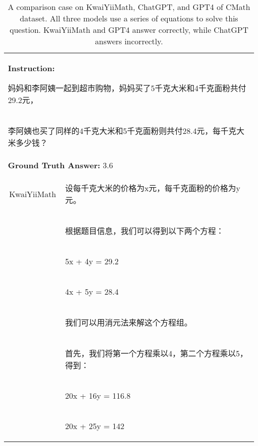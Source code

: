 \documentclass{article}
\begin{document}
\begin{table}[h!]
\caption{A comparison case on KwaiYiiMath, ChatGPT, and GPT4 of CMath dataset. All three models use a series of equations to solve this question. KwaiYiiMath and GPT4 answer correctly, while ChatGPT answers incorrectly.}
\begin{tabular}{ c|l } 
 \hline
 \multicolumn{2}{l}{\textbf{Instruction:} \begin{CJK*}{UTF8}{gbsn} 妈妈和李阿姨一起到超市购物，妈妈买了5千克大米和4千克面粉共付29.2元，\end{CJK*}} \\
 \multicolumn{2}{l}{\begin{CJK*}{UTF8}{gbsn}李阿姨也买了同样的4千克大米和5千克面粉则共付28.4元，每千克大米多少钱？ \end{CJK*}}\\
 \hline
 \multicolumn{2}{l}{\textbf{Ground Truth Answer:} 3.6} \\
 \hline
 KwaiYiiMath & \begin{CJK*}{UTF8}{gbsn} 设每千克大米的价格为x元，每千克面粉的价格为y元。\end{CJK*}\\
             & \begin{CJK*}{UTF8}{gbsn} 根据题目信息，我们可以得到以下两个方程：\end{CJK*}\\
             & \begin{CJK*}{UTF8}{gbsn} 5x + 4y = 29.2\end{CJK*}\\
             & \begin{CJK*}{UTF8}{gbsn} 4x + 5y = 28.4\end{CJK*}\\ 
             & \begin{CJK*}{UTF8}{gbsn} 我们可以用消元法来解这个方程组。\end{CJK*}\\ 
             & \begin{CJK*}{UTF8}{gbsn} 首先，我们将第一个方程乘以4，第二个方程乘以5，得到：\end{CJK*} \\
             & \begin{CJK*}{UTF8}{gbsn} 20x + 16y = 116.8\end{CJK*} \\
             & \begin{CJK*}{UTF8}{gbsn} 20x + 25y = 142\end{CJK*} \\

\end{tabular}
\end{table}
\end{document}
